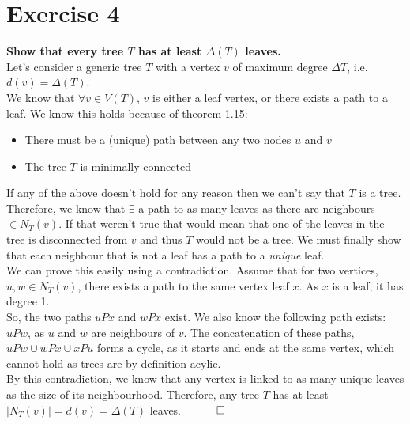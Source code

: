 \section*{Exercise 4}
\boldmath
\textbf{Show that every tree $T$ has at least $\Delta(T)$ leaves.}\\
\unboldmath
\linebreak
Let's consider a generic tree $T$ with a vertex $v$ of maximum degree $\Delta T$, i.e. $d(v) = \Delta(T)$. \\
\linebreak 
We know that $\forall v \in V(T)$, $v$ is either a leaf vertex, or there exists a path to a leaf. We know this holds because of theorem 1.15:
\begin{itemize}
       \item There must be a (unique) path between any two nodes $u$ and $v$
       \item The tree $T$ is minimally connected
\end{itemize}
If any of the above doesn't hold for any reason then we can't say that $T$ is a tree. 
\\
\linebreak 
Therefore, we know that $\exists$ a path to as many leaves as there are neighbours $\in N_T(v)$. If that weren't true that would mean that one of the leaves in the tree is disconnected from $v$ and thus $T$ would not be a tree. We must finally show that each neighbour that is not a leaf has a path to a \textit{unique} leaf. \\
\linebreak 
We can prove this easily using a contradiction. Assume that for two vertices, $u, w \in N_T(v)$,
there exists a path to the same vertex leaf $x$. As $x$ is a leaf, it has degree 1.\\
\linebreak 
So, the two paths $uPx$ and $wPx$ exist. We also know the following path exists: $uPw$, as $u$ and $w$ are neighbours of $v$. The concatenation of these paths, $uPw \cup wPx \cup xPu$ forms a cycle, as it starts and ends at the same vertex, which cannot hold as trees are by definition acylic.  \\
\linebreak 
By this contradiction, we know that any vertex is linked to as many unique leaves as the size of its neighbourhood. Therefore, any tree $T$ has at least $|N_T(v)| = d(v) = \Delta(T)$ leaves. $\hspace{10mm} \square$ 
